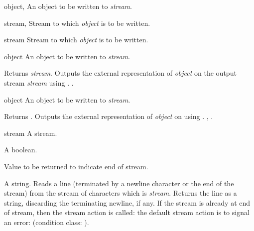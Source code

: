 \begin{optDefinition}
\begin{specargs}
    \item[object, \classref{object}] An object to be written to {\em stream}.
    \item[stream, \classref{file-stream}] Stream to which {\em object\/} is
    to be written.
\end{specargs}

\begin{arguments}
    \item[stream] Stream to which {\em object\/} is to be written.
    \item[object] An object to be written to {\em stream}.
\end{arguments}
%
\result%
Returns {\em stream}.
%
\remarks%
Outputs the external representation of {\em object\/} on the output
stream {\em stream\/} using .
%
\seealso%
.

\begin{arguments}
    \item[object] An object to be written to {\em stream}.
\end{arguments}
%
\result%
Returns .
%
\remarks%
Outputs the external representation of {\em object\/} on 
using .
%
\seealso%
, .


\begin{arguments}
    \item[stream] A stream.
    \item[\optional{eos-error?}] A boolean.
    \item[\optional{eos-value}] Value to be returned to indicate end of stream.
\end{arguments}
%
\result%
A string.
%
\remarks%
Reads a line (terminated by a newline character or the end of the
stream) from the stream of characters which is {\em stream}.  Returns
the line as a string, discarding the terminating newline, if any.  If
the stream is already at end of stream, then the stream action is
called: the default stream action is to signal an error: (condition
class: ).


\end{optDefinition}
